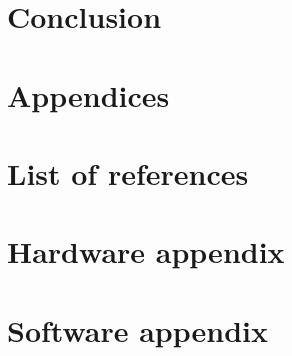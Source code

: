 \chapter{Conclusion}

\chapter{Appendices}

\chapter{List of references}

\newpage
\listoffigures
{}
\newpage
\listoftables
{}
\newpage
\chapter{Hardware appendix}

\chapter{Software appendix}


\printbibliography
\listoffixmes
